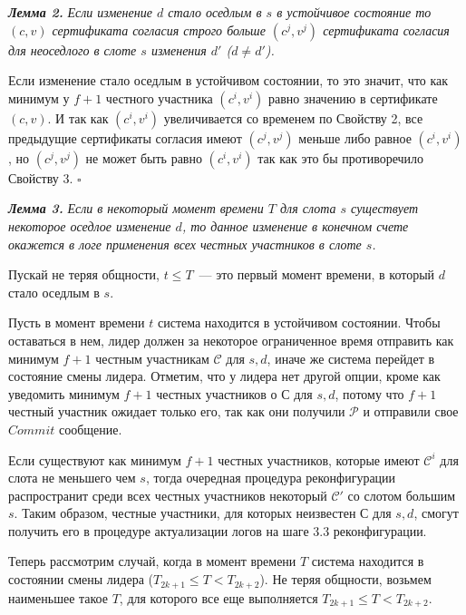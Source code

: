 \textbf{\textit{Лемма 2.}} \textit{Если изменение $d$ стало оседлым в $s$ в устойчивое состояние то $(c, v)$ сертификата согласия строго больше $(c^j, v^j)$ сертификата согласия для неоседлого в слоте $s$ изменения $d'$ ($d \ne d'$).}

Если изменение стало оседлым в устойчивом состоянии, то это значит, что как минимум у $f+1$ честного участника $(c^i, v^i)$ равно значению в сертификате $(c, v)$. И так как $(c^i, v^i)$ увеличивается со временем по Свойству 2, все предыдущие сертификаты согласия имеют $(c^j, v^j)$ меньше либо равное $(c^i, v^i)$, но $(c^j, v^j)$ не может быть равно $(c^i, v^i)$ так как это бы противоречило Свойству 3.
$\square$
\vspace{10pt}

\textbf{\textit{Лемма 3.}} \textit{Если в некоторый момент времени $T$ для слота $s$ существует некоторое оседлое изменение $d$, то данное изменение в конечном счете окажется в логе применения всех честных участников в слоте $s$.}

Пускай не теряя общности, $t \le T$~--- это первый момент времени, в который $d$ стало оседлым в $s$.

Пусть в момент времени $t$ система находится в устойчивом состоянии. Чтобы оставаться в нем, лидер  должен за некоторое ограниченное время отправить как минимум $f+1$ честным участникам $\mathcal{C}$ для $s, d$, иначе же система перейдет в состояние смены лидера. Отметим, что у лидера нет другой опции, кроме как уведомить минимум $f+1$ честных участников о $\mathcal{С}$ для $s, d$, потому что $f+1$ честный участник ожидает только его, так как они получили $\mathcal{P}$ и отправили свое $Commit$ сообщение.

Если существуют как минимум $f+1$ честных участников, которые имеют $\mathcal{C}^i$ для слота не меньшего чем $s$, тогда очередная процедура реконфигурации распространит среди всех честных участников некоторый $\mathcal{C}'$ со слотом большим $s$. Таким образом, честные участники, для которых неизвестен $\mathcal{С}$ для $s, d$, смогут получить его в процедуре актуализации логов на шаге 3.3 реконфигурации.

Теперь рассмотрим случай, когда в момент времени $T$ система находится в состоянии смены лидера ($T_{2k+1} \le T < T_{2k+2}$). Не теряя общности, возьмем наименьшее такое $T$, для которого все еще выполняется $T_{2k+1} \le T < T_{2k+2}$.


